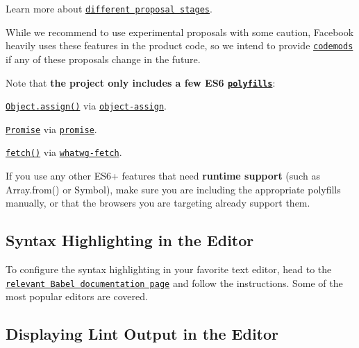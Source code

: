 Learn more about \href{https://babeljs.io/docs/plugins/#presets-stage-x-experimental-presets-}{\tt different proposal stages}.

While we recommend to use experimental proposals with some caution, Facebook heavily uses these features in the product code, so we intend to provide \href{https://medium.com/@cpojer/effective-javascript-codemods-5a6686bb46fb}{\tt codemods} if any of these proposals change in the future.

Note that {\bfseries the project only includes a few E\+S6 \href{https://en.wikipedia.org/wiki/Polyfill}{\tt polyfills}}\+:


\begin{DoxyItemize}
\item \href{https://developer.mozilla.org/en/docs/Web/JavaScript/Reference/Global_Objects/Object/assign}{\tt {\ttfamily Object.\+assign()}} via \href{https://github.com/sindresorhus/object-assign}{\tt {\ttfamily object-\/assign}}.
\item \href{https://developer.mozilla.org/en-US/docs/Web/JavaScript/Reference/Global_Objects/Promise}{\tt {\ttfamily Promise}} via \href{https://github.com/then/promise}{\tt {\ttfamily promise}}.
\item \href{https://developer.mozilla.org/en/docs/Web/API/Fetch_API}{\tt {\ttfamily fetch()}} via \href{https://github.com/github/fetch}{\tt {\ttfamily whatwg-\/fetch}}.
\end{DoxyItemize}

If you use any other E\+S6+ features that need {\bfseries runtime support} (such as {\ttfamily Array.\+from()} or {\ttfamily Symbol}), make sure you are including the appropriate polyfills manually, or that the browsers you are targeting already support them.

\subsection*{Syntax Highlighting in the Editor}

To configure the syntax highlighting in your favorite text editor, head to the \href{https://babeljs.io/docs/editors}{\tt relevant Babel documentation page} and follow the instructions. Some of the most popular editors are covered.

\subsection*{Displaying Lint Output in the Editor}


